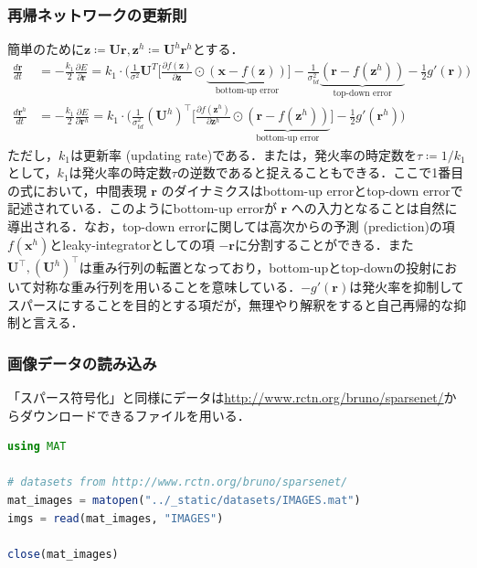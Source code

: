 \subsubsection{再帰ネットワークの更新則}
簡単のために$\mathbf{z}\coloneqq\mathbf{U}\mathbf{r}, \mathbf{z}^h\coloneqq\mathbf{U}^h\mathbf{r}^h$とする．
\begin{align}
\frac{d \mathbf{r}}{d t}&=-\frac{k_{1}}{2} \frac{\partial E}{\partial \mathbf{r}}=k_{1}\cdot\Bigg(\frac{1}{\sigma^{2}} \mathbf{U}^{T}\bigg[\frac{\partial f(\mathbf{z})}{\partial \mathbf{z}}\odot\underbrace{(\mathbf{x}-f(\mathbf{z}))}_{\text{bottom-up error}}\bigg]-\frac{1}{\sigma_{t d}^{2}}\underbrace{\left(\mathbf{r}-f(\mathbf{z}^h)\right)}_{\text{top-down error}}-\frac{1}{2}g'(\mathbf{r})\Bigg)\\
\frac{d \mathbf{r}^h}{d t}&=-\frac{k_{1}}{2} \frac{\partial E}{\partial \mathbf{r}^h}=k_{1}\cdot\Bigg(\frac{1}{\sigma_{t d}^{2}}(\mathbf{U}^h)^\top\bigg[\frac{\partial f(\mathbf{z}^h)}{\partial \mathbf{z}^h}\odot\underbrace{\left(\mathbf{r}-f(\mathbf{z}^h)\right)}_{\text{bottom-up error}}\bigg]-\frac{1}{2}g'(\mathbf{r}^h)\Bigg)
\end{align}
ただし，$k_1$は更新率 (updating rate)である．または，発火率の時定数を$\tau\coloneqq1/k_1$として，$k_1$は発火率の時定数$\tau$の逆数であると捉えることもできる．ここで1番目の式において，中間表現 $\mathbf{r}$ のダイナミクスはbottom-up errorとtop-down errorで記述されている．このようにbottom-up errorが $\mathbf{r}$ への入力となることは自然に導出される．なお，top-down errorに関しては高次からの予測 (prediction)の項 $f(\mathbf{x}^h)$とleaky-integratorとしての項 $-\mathbf{r}$に分割することができる．また$\mathbf{U}^\top, (\mathbf{U}^h)^\top$は重み行列の転置となっており，bottom-upとtop-downの投射において対称な重み行列を用いることを意味している．$-g'(\mathbf{r})$は発火率を抑制してスパースにすることを目的とする項だが，無理やり解釈をすると自己再帰的な抑制と言える．
\subsubsection{画像データの読み込み}
「スパース符号化」と同様にデータは\url{http://www.rctn.org/bruno/sparsenet/}からダウンロードできるファイルを用いる．
\begin{lstlisting}[language=julia]
using MAT

# datasets from http://www.rctn.org/bruno/sparsenet/
mat_images = matopen("../_static/datasets/IMAGES.mat")
imgs = read(mat_images, "IMAGES")

close(mat_images)
\end{lstlisting}
